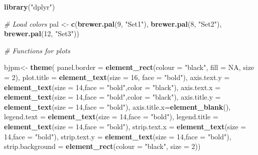 \documentclass[]{article}
\newenvironment{Shaded}{\begin{snugshade}}{\end{snugshade}}
\newcommand{\KeywordTok}[1]{\textcolor[rgb]{0.13,0.29,0.53}{\textbf{#1}}}
\newcommand{\DataTypeTok}[1]{\textcolor[rgb]{0.13,0.29,0.53}{#1}}
\newcommand{\DecValTok}[1]{\textcolor[rgb]{0.00,0.00,0.81}{#1}}
\newcommand{\StringTok}[1]{\textcolor[rgb]{0.31,0.60,0.02}{#1}}
\newcommand{\CommentTok}[1]{\textcolor[rgb]{0.56,0.35,0.01}{\textit{#1}}}
\newcommand{\OtherTok}[1]{\textcolor[rgb]{0.56,0.35,0.01}{#1}}
\newcommand{\NormalTok}[1]{#1}
\begin{document}
\begin{Shaded}
\begin{Highlighting}[]
\KeywordTok{library}\NormalTok{(}\StringTok{"dplyr"}\NormalTok{)}

\CommentTok{# Load colors}
\NormalTok{pal <-}\StringTok{ }\KeywordTok{c}\NormalTok{(}\KeywordTok{brewer.pal}\NormalTok{(}\DecValTok{9}\NormalTok{, }\StringTok{"Set1"}\NormalTok{), }\KeywordTok{brewer.pal}\NormalTok{(}\DecValTok{8}\NormalTok{, }\StringTok{"Set2"}\NormalTok{), }\KeywordTok{brewer.pal}\NormalTok{(}\DecValTok{12}\NormalTok{, }\StringTok{"Set3"}\NormalTok{))}

\CommentTok{# Functions for plots}

\NormalTok{bjpm<-}
\KeywordTok{theme}\NormalTok{(}
  \DataTypeTok{panel.border =} \KeywordTok{element_rect}\NormalTok{(}\DataTypeTok{colour =} \StringTok{"black"}\NormalTok{, }\DataTypeTok{fill =} \OtherTok{NA}\NormalTok{, }\DataTypeTok{size =} \DecValTok{2}\NormalTok{),}
  \DataTypeTok{plot.title =} \KeywordTok{element_text}\NormalTok{(}\DataTypeTok{size =} \DecValTok{16}\NormalTok{, }\DataTypeTok{face =} \StringTok{"bold"}\NormalTok{),}
  \DataTypeTok{axis.text.y =}  \KeywordTok{element_text}\NormalTok{(}\DataTypeTok{size =} \DecValTok{14}\NormalTok{,}\DataTypeTok{face =} \StringTok{"bold"}\NormalTok{,}\DataTypeTok{color =} \StringTok{"black"}\NormalTok{),}
  \DataTypeTok{axis.text.x =}  \KeywordTok{element_text}\NormalTok{(}\DataTypeTok{size =} \DecValTok{14}\NormalTok{,}\DataTypeTok{face =} \StringTok{"bold"}\NormalTok{,}\DataTypeTok{color =} \StringTok{"black"}\NormalTok{),}
  \DataTypeTok{axis.title.y =} \KeywordTok{element_text}\NormalTok{(}\DataTypeTok{size =} \DecValTok{14}\NormalTok{,}\DataTypeTok{face =} \StringTok{"bold"}\NormalTok{),}
  \DataTypeTok{axis.title.x=}\KeywordTok{element_blank}\NormalTok{(),}
  \DataTypeTok{legend.text =} \KeywordTok{element_text}\NormalTok{(}\DataTypeTok{size =} \DecValTok{14}\NormalTok{,}\DataTypeTok{face =} \StringTok{"bold"}\NormalTok{),}
  \DataTypeTok{legend.title =} \KeywordTok{element_text}\NormalTok{(}\DataTypeTok{size =} \DecValTok{14}\NormalTok{,}\DataTypeTok{face =} \StringTok{"bold"}\NormalTok{),}
  \DataTypeTok{strip.text.x =} \KeywordTok{element_text}\NormalTok{(}\DataTypeTok{size =} \DecValTok{14}\NormalTok{,}\DataTypeTok{face =} \StringTok{"bold"}\NormalTok{),}
  \DataTypeTok{strip.text.y =} \KeywordTok{element_text}\NormalTok{(}\DataTypeTok{size =} \DecValTok{14}\NormalTok{,}\DataTypeTok{face =} \StringTok{"bold"}\NormalTok{),}
  \DataTypeTok{strip.background =} \KeywordTok{element_rect}\NormalTok{(}\DataTypeTok{colour =} \StringTok{"black"}\NormalTok{, }\DataTypeTok{size =} \DecValTok{2}\NormalTok{))}


\end{Highlighting}
\end{Shaded}
\end{document}
